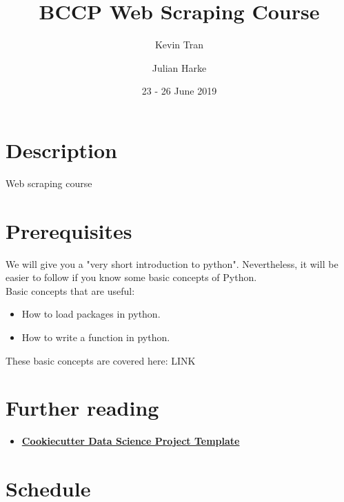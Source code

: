 \documentclass[a4paper]{article}
\begin{document}
\title{BCCP Web Scraping Course}
\author{Kevin Tran \and Julian Harke}
\date{23 - 26 June 2019}
\maketitle{}

\section{Description}

Web scraping course

\section{Prerequisites}

We will give you a "very short introduction to python". Nevertheless,
it will be easier to follow if you know some basic concepts of Python.\\

Basic concepts that are useful:
\begin{itemize}
    \item How to load packages in python.
    \item How to write a function in python.
\end{itemize}

These basic concepts are covered here:
LINK

\section{Further reading}

\begin{itemize}
    \item{
      \href{
        http://drivendata.github.io/cookiecutter-data-science/}{
        \textbf{Cookiecutter Data Science Project Template}}}
\end{itemize}

\section{Schedule}
\end{document}
